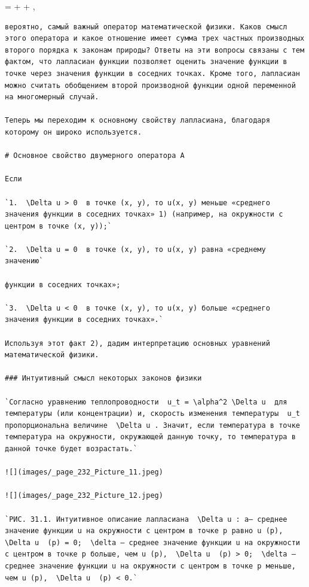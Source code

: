 \documentclass[
  ukrainian,
]{article}
\begin{document}
\Delta =  +
 + ,

\begin{verbatim}
вероятно, самый важный оператор математической физики. Каков смысл этого оператора и какое отношение имеет сумма трех частных производных второго порядка к законам природы? Ответы на эти вопросы связаны с тем фактом, что лапласиан функции позволяет оценить значение функции в точке через значения функции в соседних точках. Кроме того, лапласиан можно считать обобщением второй производной функции одной переменной на многомерный случай.

Теперь мы переходим к основному свойству лапласиана, благодаря которому он широко используется.

# Основное свойство двумерного оператора А

Если

`1.  \Delta u > 0  в точке (x, y), то u(x, y) меньше «среднего значения функции в соседних точках» 1) (например, на окружности с центром в точке (x, y));`

`2.  \Delta u = 0  в точке (x, y), то u(x, y) равна «среднему значению`

функции в соседних точках»;

`3.  \Delta u < 0  в точке (x, y), то u(x, y) больше «среднего значения функции в соседних точках».`

Используя этот факт 2), дадим интерпретацию основных уравнений математической физики.

### Интуитивный смысл некоторых законов физики

`Согласно уравнению теплопроводности  u_t = \alpha^2 \Delta u  для температуры (или концентрации) и, скорость изменения температуры  u_t  пропорциональна величине  \Delta u . Значит, если температура в точке температура на окружности, окружающей данную точку, то температура в данной точке будет возрастать.`

![](images/_page_232_Picture_11.jpeg)

![](images/_page_232_Picture_12.jpeg)

`РИС. 31.1. Интуитивное описание лапласиана  \Delta u : a— среднее значение функции u на окружности с центром в точке p равно u (p),  \Delta u  (p) = 0;  \delta — среднее значение функции u на окружности с центром в точке p больше, чем u (p),  \Delta u  (p) > 0;  \delta — среднее значение функции u на окружности с центром в точке p меньше, чем u (p),  \Delta u  (p) < 0.`


\end{verbatim}
\end{document}
